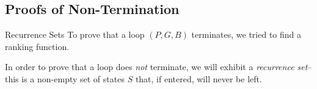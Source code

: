 \documentclass[xcolor=pdftex,t,11pt]{beamer}
\begin{document}
\subsection{Proofs of Non-Termination}

\begin{frame}{Recurrence Sets}
 To prove that a loop $(P, G, B)$ terminates, we tried to find a ranking function.

 \vspace{1em}

 In order to prove that a loop does \emph{not} terminate, we will exhibit a \emph{recurrence set}\footnotemark --
 this is a non-empty set of states $S$ that, if entered, will never be left.

 
\end{frame}
\end{document}
